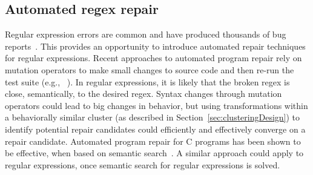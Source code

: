 \subsection{Automated regex repair}
Regular expression errors are common and have produced thousands of bug reports~. This provides an opportunity to introduce automated repair techniques for regular expressions.
Recent approaches to automated program repair rely on mutation operators to make small changes to source code and then re-run the test suite (e.g., ~). In regular expressions, it is likely that the broken regex is close, semantically, to the desired regex. Syntax changes through mutation operators could lead to big changes in behavior, but using transformations within a behaviorally similar cluster (as described in Section~\ref{sec:clusteringDesign}) to identify potential repair candidates could efficiently and effectively converge on a repair candidate.  Automated program repair for C programs has been shown to be effective, when based on semantic search~.  A similar approach could apply to regular expressions, once semantic search for regular expressions is solved.


